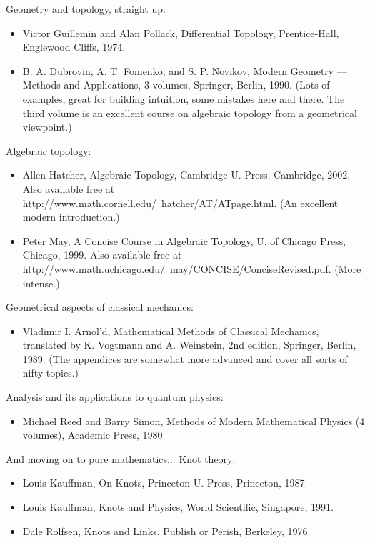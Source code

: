 \documentclass[10pt,a4paper]{book}
\theoremstyle{definition}
\begin{document}
Geometry and topology, straight up:

\begin{itemize}
\item Victor Guillemin and Alan Pollack, Differential Topology, Prentice-Hall, Englewood Cliffs, 1974.
\item B. A. Dubrovin, A. T. Fomenko, and S. P. Novikov, Modern Geometry — Methods and Applications, 3 volumes, Springer, Berlin, 1990. (Lots of examples, great for building intuition, some mistakes here and there. The third volume is an excellent course on algebraic topology from a geometrical viewpoint.)
\end{itemize}

Algebraic topology:

\begin{itemize}
\item Allen Hatcher, Algebraic Topology, Cambridge U. Press, Cambridge, 2002. Also available free at http://www.math.cornell.edu/~hatcher/AT/ATpage.html. (An excellent modern introduction.)
\item Peter May, A Concise Course in Algebraic Topology, U. of Chicago Press, Chicago, 1999. Also available free at http://www.math.uchicago.edu/~may/CONCISE/ConciseRevised.pdf. (More intense.)
\end{itemize}

Geometrical aspects of classical mechanics:

\begin{itemize}
\item Vladimir I. Arnol'd, Mathematical Methods of Classical Mechanics, translated by K. Vogtmann and A. Weinstein, 2nd edition, Springer, Berlin, 1989. (The appendices are somewhat more advanced and cover all sorts of nifty topics.)
\end{itemize}

Analysis and its applications to quantum physics:

\begin{itemize}
\item Michael Reed and Barry Simon, Methods of Modern Mathematical Physics (4 volumes), Academic Press, 1980.
\end{itemize}

And moving on to pure mathematics...
Knot theory:

\begin{itemize}
\item Louis Kauffman, On Knots, Princeton U. Press, Princeton, 1987.
\item Louis Kauffman, Knots and Physics, World Scientific, Singapore, 1991.
\item Dale Rolfsen, Knots and Links, Publish or Perish, Berkeley, 1976.
\end{itemize}
\end{document}
